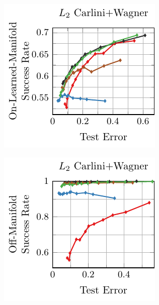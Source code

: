\begin{appendix}
\begin{figure}[t]
\begin{subfigure}{0.235\textwidth}
    \end{subfigure}
    \begin{subfigure}{0.235\textwidth}
        \centering
        \includegraphics[width=\textwidth]{appendix_l2_fonts_error_on_learned_cw.pdf}
    \end{subfigure}
    \begin{subfigure}{0.235\textwidth}
        \centering
        \includegraphics[width=\textwidth]{appendix_l2_fonts_error_off_cw.pdf}

\end{subfigure}
\end{figure}
\end{appendix}
